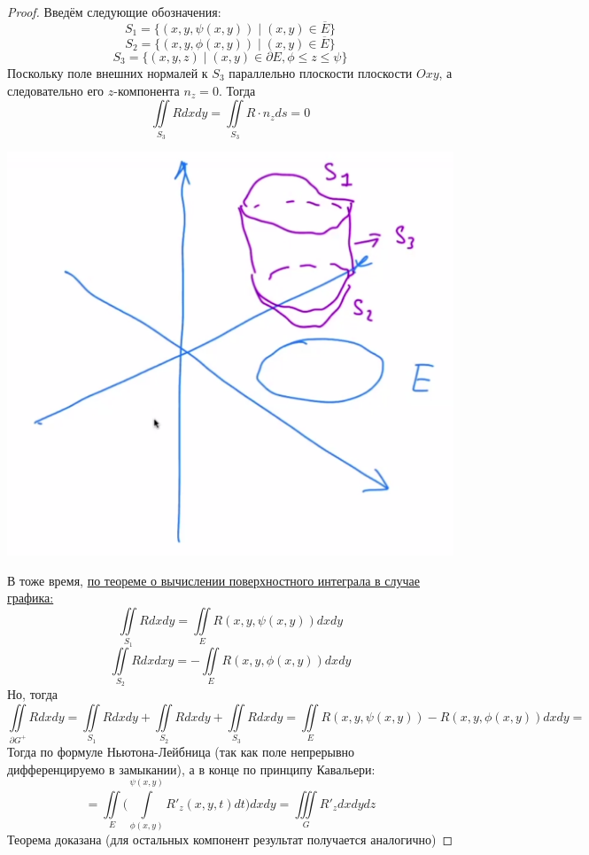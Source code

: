 \begin{proof}
    \noindent 
    \begin{minipage}{0.5\textwidth}
    Введём следующие обозначения: \[S_1 = \{(x, y, \psi(x, y)) \mid (x, y) \in \overline{E}\}\]
    \[S_2 = \{(x, y, \phi(x, y)) \mid (x, y) \in \overline{E}\}\]
    \[S_3 = \{(x, y, z) \mid (x, y) \in \partial E, \phi \leq z \leq \psi\}\]
    Поскольку поле внешних нормалей к $S_3$ параллельно плоскости плоскости $Oxy$, а следовательно его $z$-компонента $n_z = 0$. Тогда \[\iint\limits_{S_3} Rdxdy = \iint\limits_{S_3} R \cdot n_z ds = 0\]
    \end{minipage}
    \begin{minipage}{0.55\textwidth}
    \includegraphics[width=\textwidth]{images/minigaus.png}
    \end{minipage}
    В тоже время, \hyperlink{graph_gaus}{по теореме о вычислении поверхностного интеграла в случае графика:} \[\iint\limits_{S_1} Rdxdy = \iint\limits_E R(x, y, \psi(x, y))dxdy\] \[\iint\limits_{S_2} Rdxdxy = -\iint\limits_{E} R(x, y, \phi(x, y))dxdy\]
    Но, тогда \[\iint\limits_{\partial G^+} Rdxdy = \iint\limits_{S_1}Rdxdy + \iint\limits_{S_2}Rdxdy + \iint\limits_{S_3}Rdxdy = \iint\limits_E R(x, y, \psi(x, y)) - R(x, y, \phi(x, y))dxdy = \]
    Тогда по формуле Ньютона-Лейбница (так как поле непрерывно дифференцируемо в замыкании), а в конце по принципу Кавальери: \[ = \iint\limits_{E} \biggr(\int\limits_{\phi(x, y)}^{\psi(x, y)} R'_z(x, y, t)dt\biggr) dxdy = \iiint\limits_G R'_zdxdydz\]
    Теорема доказана (для остальных компонент результат получается аналогично)
\end{proof}
